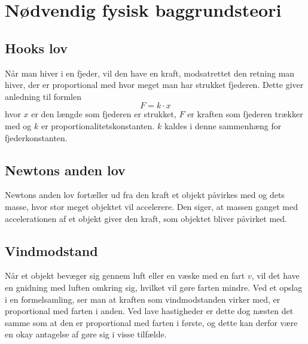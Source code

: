 \section{Nødvendig fysisk baggrundsteori}
\subsection{Hooks lov}\label{teori:Hooks lov}
Når man hiver i en fjeder, vil den have en kraft, modsatrettet den retning man hiver, der er proportional med hvor meget man har strukket fjederen. 
Dette giver anledning til formlen 
$$F =k\cdot x$$
hvor $x$ er den længde som fjederen er strukket, $F$ er kraften som fjederen trækker med og $k$ er proportionalitetskonstanten. 
$k$ kaldes i denne sammenhæng for fjederkonstanten.

\subsection{Newtons anden lov}\label{teori:Newtons anden lov}
Newtons anden lov fortæller ud fra den kraft et objekt påvirkes med og dets masse, hvor stor meget objektet vil accelerere. 
Den siger, at massen ganget med accelerationen af et objekt giver den kraft, som objektet bliver påvirket med.

\subsection{Vindmodstand}\label{teori:vindmodstand}
Når et objekt bevæger sig gennem luft eller en væske med en fart $v$, vil det have en gnidning med luften omkring sig, hvilket vil gøre farten mindre.
Ved et opslag i en formelsamling, ser man at kraften som vindmodstanden virker med, er proportional med farten i anden. 
Ved lave hastigheder er dette dog næsten det samme som at den er proportional med farten i første, og dette kan derfor være en okay antagelse af gøre sig i visse tilfælde.
